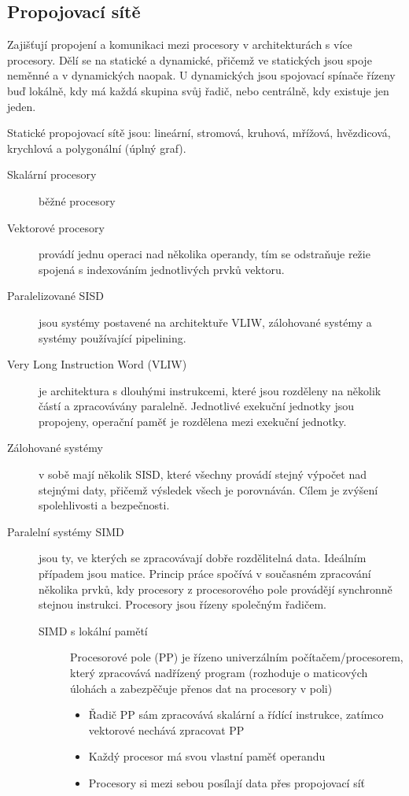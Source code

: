 \documentclass[10pt,a4paper,openright]{article}
\begin{document}
\subsection{Propojovací sítě}
Zajišťují propojení a komunikaci mezi procesory v architekturách s více procesory. Dělí se na statické a dynamické, přičemž ve statických jsou spoje neměnné a v dynamických naopak. U dynamických jsou spojovací spínače řízeny buď lokálně, kdy má každá skupina svůj řadič, nebo centrálně, kdy existuje jen jeden.

Statické propojovací sítě jsou: lineární, stromová, kruhová, mřížová, hvězdicová, krychlová a polygonální (úplný graf).

\begin{description}
\item[Skalární procesory] běžné procesory
\item[Vektorové procesory] provádí jednu operaci nad několika operandy, tím se odstraňuje režie spojená s indexováním jednotlivých prvků vektoru.
\item[Paralelizované SISD] jsou systémy postavené na architektuře VLIW, zálohované systémy a systémy používající pipelining.
\item[Very Long Instruction Word (VLIW)] je architektura s dlouhými instrukcemi, které jsou rozděleny na několik částí a zpracovávány paralelně. Jednotlivé exekuční jednotky jsou propojeny, operační paměť je rozdělena mezi exekuční jednotky.
\item[Zálohované systémy] v sobě mají několik SISD, které všechny provádí stejný výpočet nad stejnými daty, přičemž výsledek všech je porovnáván. Cílem je zvýšení spolehlivosti a bezpečnosti.
\item[Paralelní systémy SIMD] jsou ty, ve kterých se zpracovávají dobře rozdělitelná data. Ideálním případem jsou matice. Princip práce spočívá v současném zpracování několika prvků, kdy procesory z procesorového pole provádějí synchronně stejnou instrukci. Procesory jsou řízeny společným řadičem.
\begin{description}
\item [SIMD s lokální pamětí] Procesorové pole (PP) je řízeno univerzálním počítačem/procesorem, který zpracovává nadřízený program (rozhoduje o maticových úlohách a zabezpěčuje přenos dat na procesory v poli)
	\begin{itemize}
	\item Řadič PP sám zpracovává skalární a řídící instrukce, zatímco vektorové nechává zpracovat PP
	\item Každý procesor má svou vlastní paměť operandu
	\item Procesory si mezi sebou posílají data přes propojovací síť
	\end{itemize}
	

\end{description}
\end{description}
\end{document}
